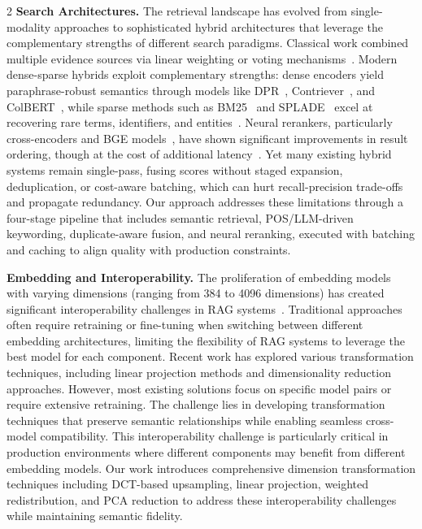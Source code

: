 \documentclass[10pt,letterpaper]{article}
\let\cite\citep
\begin{document}
\begin{multicols}{2}
\textbf{Search Architectures.}
The retrieval landscape has evolved from single-modality approaches to sophisticated hybrid architectures that leverage the complementary strengths of different search paradigms. Classical work combined multiple evidence sources via linear weighting or voting mechanisms~\cite{lee1997combining}. Modern dense-sparse hybrids exploit complementary strengths: dense encoders yield paraphrase-robust semantics through models like DPR~\cite{karpukhin2020dpr}, Contriever~\cite{izacard2021contriever}, and ColBERT~\cite{khattab2020colbert}, while sparse methods such as BM25~\cite{robertson2009bm25} and SPLADE~\cite{formal2021splade} excel at recovering rare terms, identifiers, and entities~\cite{gao2021retrieval}. Neural rerankers, particularly cross-encoders and BGE models~\cite{nogueira2019rerankbert,xu2023bge}, have shown significant improvements in result ordering, though at the cost of additional latency~\cite{mao2023neural}. Yet many existing hybrid systems remain single-pass, fusing scores without staged expansion, deduplication, or cost-aware batching, which can hurt recall-precision trade-offs and propagate redundancy. Our approach addresses these limitations through a four-stage pipeline that includes semantic retrieval, POS/LLM-driven keywording, duplicate-aware fusion, and neural reranking, executed with batching and caching to align quality with production constraints.

\textbf{Embedding and Interoperability.}
The proliferation of embedding models with varying dimensions (ranging from 384 to 4096 dimensions) has created significant interoperability challenges in RAG systems~\cite{huerga2025optimization, brown2024cross, conneau2018word}. Traditional approaches often require retraining or fine-tuning when switching between different embedding architectures, limiting the flexibility of RAG systems to leverage the best model for each component. Recent work has explored various transformation techniques, including linear projection methods and dimensionality reduction approaches. However, most existing solutions focus on specific model pairs or require extensive retraining. The challenge lies in developing transformation techniques that preserve semantic relationships while enabling seamless cross-model compatibility. This interoperability challenge is particularly critical in production environments where different components may benefit from different embedding models. Our work introduces comprehensive dimension transformation techniques including DCT-based upsampling, linear projection, weighted redistribution, and PCA reduction to address these interoperability challenges while maintaining semantic fidelity.


\end{multicols}
\end{document}
